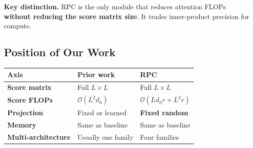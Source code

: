 \textbf{Key distinction.} RPC is the only module that reduces attention FLOPs 
\textbf{without reducing the score matrix size}. It trades inner-product 
precision for compute.

\subsection{Position of Our Work}

\begin{table}[H]
\centering
\small
\begin{tabular}{lll}
\toprule
\textbf{Axis} & \textbf{Prior work} & \textbf{RPC} \\
\midrule
\textbf{Score matrix} & Full $L \times L$ & Full $L \times L$ \\
\textbf{Score FLOPs} & $\mathcal{O}(L^2 d_h)$ & $\mathcal{O}(L d_h r + L^2 r)$ \\
\textbf{Projection} & Fixed or learned & \textbf{Fixed random} \\
\textbf{Memory} & Same as baseline & Same as baseline \\
\textbf{Multi-architecture} & Usually one family & Four families \\
\bottomrule
\end{tabular}
\end{table}

